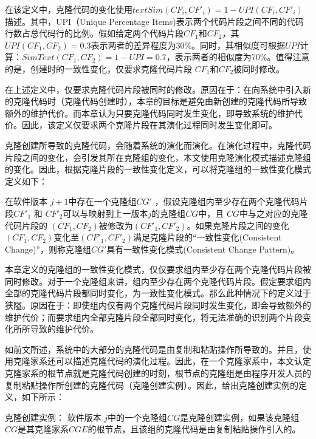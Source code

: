 在该定义中，克隆代码的变化使用$\mathit {textSim}(CF_i, CF'_i)= 1 - UPI(CF_i, CF'_i)$描述。其中，UPI（Unique Percentage Items\cite{roy2008nicad})表示两个代码片段之间不同的代码行数占总代码行的比例。假如给定两个代码片段$CF_1$和$CF_2$，其$UPI(CF_1,CF_2)=0.3$表示两者的差异程度为30\%。同时，其相似度可根据$UPI$计算：$SimText (CF_1,CF_2)=1-UPI=0.7$，表示两者的相似度为70\%。值得注意的是，创建时的一致性变化，仅要求克隆代码片段 $CF_1 $和$CF_2 $被同时修改。

在上述定义中，仅要求克隆代码片段被同时的修改。原因在于：在向系统中引入新的克隆代码时（克隆代码创建时），本章的目标是避免由新创建的克隆代码所导致额外的维护代价。而本章认为只要克隆代码同时发生变化，即导致系统的维护代价。因此，该定义仅要求两个克隆片段在其演化过程同时发生变化即可。

克隆创建所导致的克隆代码，会随着系统的演化而演化。在演化过程中，克隆代码片段之间的变化，会引发其所在克隆组的变化，本文使用克隆演化模式描述克隆组的变化。因此，根据克隆片段的一致性变化定义，可以将克隆组的一致性变化模式定义如下：

\begin{definition}[克隆创建一致性变化模式] 
\label{def-creatingpattern}
在软件版本 $j+1$中存在一个克隆组$CG'$ ，假设克隆组内至少存在两个克隆代码片段$CF'_1$ 和 $CF'_2$可以与映射到上一版本$j$的克隆组$CG$中，且 $CG$中与之对应的克隆代码片段的 $(CF_1,CF_2)$被修改为$(CF'_1,CF'_2)$。如果克隆片段之间的变化$(CF_1,CF_2)$变化至$(CF'_1,CF'_2)$满足克隆片段的“一致性变化(Consistent Change)”，则称克隆组$CG'$具有一致性变化模式(Consistent Change Pattern)。
\end{definition}

本章定义的克隆组的一致性变化模式，仅仅要求组内至少存在两个克隆代码片段被同时修改。对于一个克隆组来讲，组内至少存在两个克隆代码片段。假定要求组内全部的克隆代码片段都同时变化，为一致性变化模式。那么此种情况下的定义过于狭隘。原因在于：即使组内仅有两个克隆代码片段同时发生变化，即会导致额外的维护代价；而要求组内全部克隆片段全部同时变化，将无法准确的识别两个片段变化所所导致的维护代价。

如前文所述，系统中的大部分的克隆代码是由复制和粘贴操作所导致的。并且，使用克隆家系还可以描述克隆代码的演化过程。因此，在一个克隆家系中，本文认定克隆家系的根节点就是克隆代码创建的时刻，根节点的克隆组是由程序开发人员的复制粘贴操作所创建的克隆代码（克隆创建实例）。因此，给出克隆创建实例的定义，如下所示：

\begin{definition}[克隆创建实例] 
\label{def-creatinginstance}
克隆创建实例：
软件版本 $j$中的一个克隆组$CG$是克隆创建实例，如果该克隆组$CG$是其克隆家系$CGE$的根节点，且该组的克隆代码是由复制粘贴操作引入的。
\end{definition}

